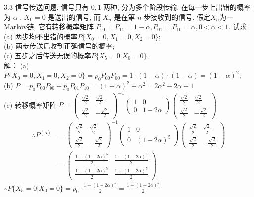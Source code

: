 3.3 信号传送问题. 信号只有 $0,1$ 两种, 分为多个阶段传输. 在每一步上出错的概率为 $\alpha$ . $X_0 = 0$ 是送出的信号, 而 $X_n$ 是在第 $n$ 步接收到的信号. 假定$X_n$为一Markov链, 它有转移概率矩阵 $P_{00} = P_{11} = 1 - \alpha , P_{01} = P_{10} = \alpha, 0 < \alpha < 1$. 试求\\
(a) 两步均不出错的概率$P\{X_0 = 0, X_1 = 0, X_2 = 0\}$;\\
(b) 两步传送后收到正确信号的概率;\\
(c) 五步之后传送无误的概率$P\{X_5 = 0 | X_0 = 0\}$.\\
解：
(a) $P\{X_0 = 0, X_1 = 0, X_2 = 0\} = p_0P_{00}P_{00} = 1 \cdot (1-\alpha) \cdot (1-\alpha) = (1-\alpha)^2$;\\
(b) $P = p_0P_{00}P_{00} + p_0P_{01}P_{10} = (1-\alpha)^2 + {\alpha}^2 = 2{\alpha}^2 - 2\alpha + 1$\\
(c) 转移概率矩阵
	$
	P = \begin{pmatrix} \frac{\sqrt{2}}{2} & \frac{\sqrt{2}}{2}\\ \frac{\sqrt{2}}{2} & -\frac{\sqrt{2}}{2} \end{pmatrix}^{-1}
	\begin{pmatrix} 1 & 0 \\ 0 & 1-2\alpha \end{pmatrix}
	\begin{pmatrix} \frac{\sqrt{2}}{2} & \frac{\sqrt{2}}{2}\\ \frac{\sqrt{2}}{2} & -\frac{\sqrt{2}}{2} \end{pmatrix}
	$\\
	\[
	\begin{aligned}
	\therefore P^{(5)} & =
		\begin{pmatrix} \frac{\sqrt{2}}{2} & \frac{\sqrt{2}}{2}\\ \frac{\sqrt{2}}{2} & -\frac{\sqrt{2}}{2} \end{pmatrix}^{-1}
		\begin{pmatrix} 1 & 0 \\ 0 & (1-2\alpha)^5 \end{pmatrix}
		\begin{pmatrix} \frac{\sqrt{2}}{2} & \frac{\sqrt{2}}{2}\\ \frac{\sqrt{2}}{2} & -\frac{\sqrt{2}}{2} \end{pmatrix}\\
					& = \begin{pmatrix}
					\frac{1+(1-2\alpha)^5}{2} & \frac{1-(1-2\alpha)^5}{2}\\ \frac{1-(1-2\alpha)^5}{2}& \frac{1+(1-2\alpha)^5}{2}
					\end{pmatrix}
	\end{aligned}
	\]
	$\therefore P\{ X_5 = 0 | X_0 = 0\} = p_0 \cdot \frac{1+(1-2\alpha)^5}{2} = \frac{1+(1-2\alpha)^5}{2}$\\


